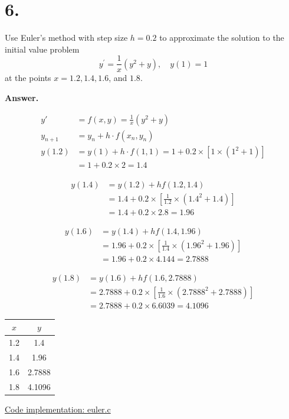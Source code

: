 \documentclass[12pt]{article}
\newenvironment{Answer}{%
  \par\medskip\noindent
  \begin{list}{}{%
    \setlength{\leftmargin}{0pt}%
    \setlength{\itemindent}{0pt}%
    \setlength{\listparindent}{0pt}%
  }%
  \item\relax
  \textbf{Answer.}\quad\ignorespaces
}{%
  \end{list}
  \par\medskip
}
\begin{document}
\section*{6.}
Use Euler's method with step size $h=0.2$ to approximate the solution to the initial value problem
\[ \displaystyle y^{\prime}=\frac{1}{x}\left(y^{2}+y\right),\quad y(1)=1 \]
at the points $x=1.2, 1.4, 1.6$, and $1.8$.
\begin{Answer}
\begin{align*}
  y' &= f(x, y) = \displaystyle \frac{1}{x}(y^2 + y) \\[0.3em]
  y_{n+1} &= y_n + h \cdot f(x_n, y_n) \\[0.5em]
  y(1.2) &= y(1) + h \cdot f(1, 1) = 1 + 0.2 \times \left[ 1 \times (1^2 + 1) \right] \\[0.3em]
  &= 1 + 0.2 \times 2 = 1.4
\end{align*}

\vspace{0.5em}
\begin{align*}
  y(1.4) &= y(1.2) + h f(1.2, 1.4) \\[0.3em]
  &= 1.4 + 0.2 \times \left[ \displaystyle \frac{1}{1.2} \times (1.4^2 + 1.4) \right] \\[0.3em]
  &= 1.4 + 0.2 \times 2.8 = 1.96
\end{align*}

\vspace{0.5em}
\begin{align*}
  y(1.6) &= y(1.4) + h f(1.4, 1.96) \\[0.3em]
  &= 1.96 + 0.2 \times \left[ \displaystyle \frac{1}{1.4} \times (1.96^2 + 1.96) \right] \\[0.3em]
  &= 1.96 + 0.2 \times 4.144 = 2.7888
\end{align*}

\vspace{0.5em}
\begin{align*}
  y(1.8) &= y(1.6) + h f(1.6, 2.7888) \\[0.3em]
  &= 2.7888 + 0.2 \times \left[ \displaystyle \frac{1}{1.6} \times (2.7888^2 + 2.7888) \right] \\[0.3em]
  &= 2.7888 + 0.2 \times 6.6039 = 4.1096
\end{align*}
\end{Answer}

\vspace{0.8em}
\begin{center}
\begin{tabular}{c c}
\toprule
\(x\) & \(y\) \\
\midrule
1.2 & 1.4 \\
1.4 & 1.96 \\
1.6 & 2.7888 \\
1.8 & 4.1096 \\
\bottomrule
\end{tabular}
\end{center}

\vspace{0.5em}
\noindent
\href{https://github.com/BrianCai666/Differential-Equations-2026Fall/blob/main/hw/hw1/euler.c}{Code implementation: euler.c}
\end{document}
